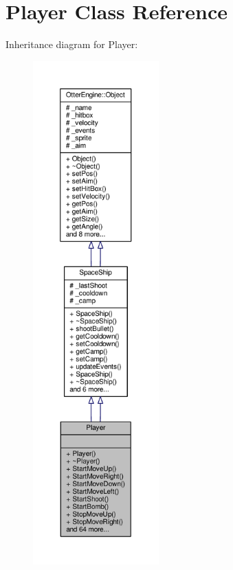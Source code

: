 \hypertarget{class_player}{}\section{Player Class Reference}
\label{class_player}


Inheritance diagram for Player\+:\nopagebreak
\begin{figure}[H]
\begin{center}
\leavevmode
\includegraphics[height=550pt]{d9/d6c/class_player__inherit__graph}
\end{center}
\end{figure}


